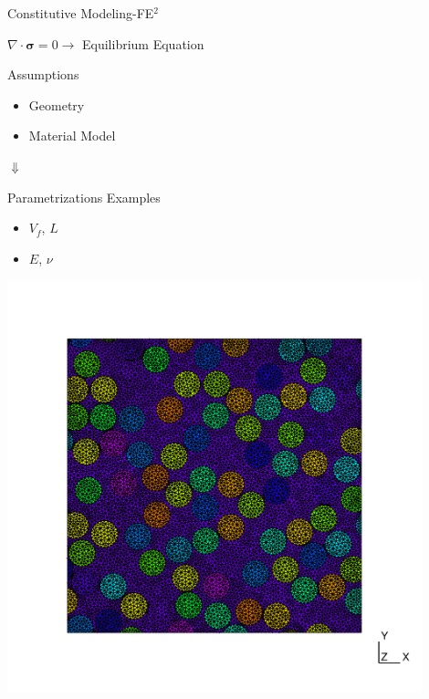   \begin{frame}{Constitutive Modeling-FE$^2$}
  \begin{center}
    $\nabla \cdot \boldsymbol{\sigma} =0 \to  $ Equilibrium Equation 
  \end{center}
   
  \begin{minipage}{0.45\textwidth}
    \begin{block}{\color{White} Assumptions}
     \begin{itemize}
        \item Geometry 
        \item Material Model
     \end{itemize}
    \end{block} 
     {
    \centering
      $\Downarrow$
    \begin{block}{\color{White} Parametrizations Examples}
     \begin{itemize}
        \item $V_f$, $L$
        \item $E$, $\nu$
     \end{itemize}
    \end{block}}
  \end{minipage}%
  \hspace{1cm}
  \begin{minipage}{0.45\textwidth}
    \centering
    \includegraphics[width=0.9\textwidth]{Figures/surrogate/rve81.pdf}
  \end{minipage}
  \end{frame}

